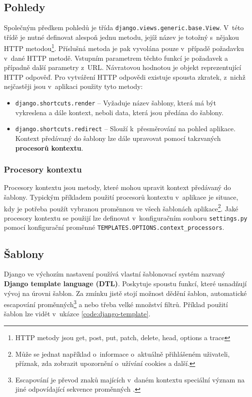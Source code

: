 \subsection{Pohledy}
Společným předkem pohledů je třída \texttt{django.views.generic.base.View}. V~této třídě je nutné definovat alespoň jednu metodu, jejíž název je totožný s~nějakou HTTP metodou\footnote{HTTP metody jsou get, post, put, patch, delete, head, options a trace}. Příslušná metoda je pak vyvolána pouze v~případě požadavku v~dané HTTP metodě. Vstupním parametrem těchto funkcí je požadavek a případně další parametry z~URL. Návratovou hodnotou je objekt reprezentující HTTP odpověď. Pro vytváření HTTP odpovědi existuje spousta zkratek, z~nichž nejčastěji jsou v~aplikaci použity tyto metody:
\begin{itemize}
    \item \texttt{django.shortcuts.render} -- Vyžaduje název šablony, která má být vykreslena a dále kontext, neboli data, která jsou předána do šablony.
    \item \texttt{django.shortcuts.redirect} -- Slouží k~přesměrování na pohled aplikace. Kontext předávaný do šablony lze dále upravovat pomocí takzvaných \textbf{procesorů kontextu}.
\end{itemize}

\subsubsection{Procesory kontextu}
\begin{sloppypar}
Procesory kontextu jsou metody, které mohou upravit kontext předávaný do šablony. Typickým příkladem použití procesorů kontextu v~aplikace je situace, kdy je potřeba použít vybranou proměnnou ve všech šablonách aplikace\footnote{Může se jednat například o~informace o~aktuálně přihlášeném uživateli, příznak, zda zobrazit upozornění o~užívání cookies a další.}. Jaké procesory kontextu se použijí lze definovat v~konfiguračním souboru \texttt{settings.py} pomocí konfigurační proměnné \texttt{TEMPLATES.OPTIONS.context\_processors}.
\end{sloppypar}


\subsection{Šablony}
Django ve výchozím nastavení používá vlastní šablonovací systém nazvaný \textbf{Django template language (DTL)}. Poskytuje spoustu funkcí, které usnadňují vývoj na úrovni šablon. Za zmínku jistě stojí možnost dědění šablon, automatické escapování proměnných\footnote{Escapování je převod znaků majících v~daném kontextu speciální význam na jiné odpovídající sekvence proměnných \cite{escape}.} a nebo třeba velké množství filtrů. Příklad použití šablon lze vidět v~ukázce \ref{code:django-template}.

